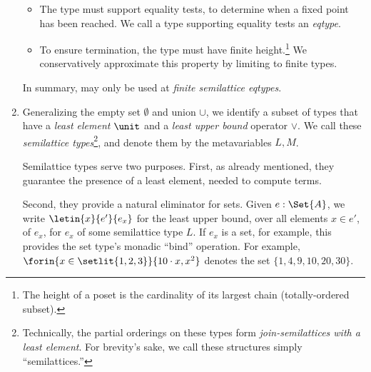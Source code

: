 \begin{enumerate}
\begin{itemize}
  \item The type must support equality tests, to determine when a fixed point
    has been reached. We call a type supporting equality tests an \emph{eqtype}.

  \item To ensure termination, the type must have finite height.\footnote{The
    height of a poset is the cardinality of its largest chain (totally-ordered
    subset).} We conservatively approximate this property by limiting 
    to finite types.
  \end{itemize}

  In summary,  may only be used at \emph{finite semilattice eqtypes}.



\item\label{item:semilattice-types} Generalizing the empty set $\emptyset$ and
  union $\cup$, we identify a subset of types that have a \emph{least element}
  $\unit$ and a \emph{least upper bound} operator $\vee$. We call these
  \emph{semilattice types}\footnote{Technically, the partial orderings on these
    types form \emph{join-semilattices with a least element}. For brevity's
    sake, we call these structures simply ``semilattices.''}, and denote them by
  the metavariables $L,M$.

  Semilattice types serve two purposes. First, as already mentioned, they
  guarantee the presence of a least element, needed to compute  terms.


  Second, they provide a natural eliminator for sets. Given $e : \Set{A}$, we
  write $\letin{x}{e'}{e_x}$ for the least upper bound, over all elements $x \in
  e'$, of $e_x$, for $e_x$ of some semilattice type $L$. If $e_x$ is a set, for
  example, this provides the set type's monadic ``bind'' operation. For example,
  $\forin{x \in \setlit{1,2,3}} \{10 \cdot x, x^2\}$ denotes the set $\{1, 4, 9,
  10, 20, 30\}$.

\end{enumerate}
